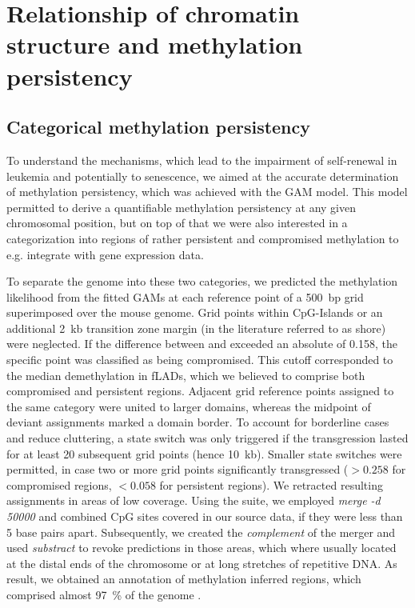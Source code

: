 \chapter{Relationship of chromatin structure and methylation persistency}
\label{chap:r:gam:chromatin}

\section{Categorical methylation persistency}
\label{chap:r:gam:chromatin:categories}

To understand the mechanisms, which lead to the impairment of self-renewal in \dnmtchip leukemia and potentially to senescence, we aimed at the accurate determination of methylation persistency, which was achieved with the GAM model. This model permitted to derive a quantifiable methylation persistency at any given chromosomal position, but on top of that we were also interested in a categorization into regions of rather persistent and compromised methylation to e.g. integrate with gene expression data.

To separate the genome into these two categories, we predicted the methylation likelihood from the fitted GAMs at each reference point of a \SI{500}{bp} grid superimposed over the mouse genome. Grid points within CpG-Islands or an additional \SI{2}{\kilo b} transition zone margin (in the literature referred to as shore) were neglected. If the difference between \dnmtwt and \dnmtchip exceeded an absolute of \num{0.158}, the specific point was classified as being compromised. This cutoff corresponded to the median demethylation in fLADs\cite{Meuleman2013}, which we believed to comprise both compromised and persistent regions. Adjacent grid reference points assigned to the same category were united to larger domains, whereas the midpoint of deviant assignments marked a domain border. To account for borderline cases and reduce cluttering, a state switch was only triggered if the transgression lasted for at least 20 subsequent grid points (hence \SI{10}{\kilo b}). Smaller state switches were permitted, in case two or more grid points significantly transgressed ($>0.258$ for compromised regions, $<0.058$ for persistent regions). We retracted resulting assignments in areas of low coverage. Using the \cite{Quinlan2010} suite, we employed \emph{merge -d 50000} and combined CpG sites covered in our source data, if they were less than 5 base pairs apart. Subsequently, we created the \emph{complement} of the merger and used \emph{substract} to revoke predictions in those areas, which where usually located at the distal ends of the chromosome or at long stretches of repetitive DNA. As result, we obtained an annotation of methylation inferred regions, which comprised almost \SI{97}{\percent} of the genome .

